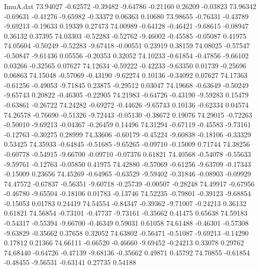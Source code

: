 \begin{filecontents}{ImuA.dat}
  73.94027   -0.62572   -0.39482   -9.64786   -0.21160    0.26209   -0.03823
  73.96342   -0.69631   -0.41276   -9.65982   -0.33372    0.06363    0.10680
  73.98655   -0.76331   -0.43789   -9.69213   -0.19633    0.19339    0.27473
  74.00989   -0.64128   -0.46421   -9.68615   -0.08947    0.36132    0.37395
  74.03303   -0.52283   -0.52762   -9.46002   -0.45585   -0.05087    0.41975
  74.05604   -0.50249   -0.52283   -9.67418   -0.00551    0.23919    0.38159
  74.08025   -0.57547   -0.50847   -9.61436    0.05556   -0.20353    0.32052
  74.10233   -0.61854   -0.47856   -9.66102    0.03266   -0.32565    0.07627
  74.12634   -0.59222   -0.42233   -9.63350    0.01739   -0.25696    0.06863
  74.15048   -0.57069   -0.43190   -9.62274    0.10136   -0.34092    0.07627
  74.17363   -0.61256   -0.49053   -9.71845    0.23875   -0.29512    0.03047
  74.19668   -0.63649   -0.50249   -9.65743    0.20822   -0.46305   -0.22905
  74.21983   -0.64726   -0.43190   -9.59283    0.15479   -0.63861   -0.26722
  74.24282   -0.69272   -0.44626   -9.65743    0.10136   -0.62334    0.04574
  74.26578   -0.76690   -0.51326   -9.72443   -0.05130   -0.38672    0.19076
  74.29015   -0.72263   -0.50010   -9.69213   -0.04367   -0.26459    0.14496
  74.31294   -0.67119   -0.45583   -9.73161   -0.12763   -0.30275    0.28999
  74.33606   -0.60179   -0.45224   -9.60838   -0.18106   -0.33329    0.53425
  74.35933   -0.64845   -0.51685   -9.65265   -0.09710   -0.15009    0.71744
  74.38256   -0.60778   -0.54915   -9.66700   -0.09710   -0.07376    0.61821
  74.40568   -0.54078   -0.55633   -9.59761   -0.12763   -0.05850    0.41975
  74.42880   -0.57069   -0.61256   -9.63709   -0.17343   -0.15009    0.23656
  74.45269   -0.64965   -0.63529   -9.59402   -0.31846   -0.08903   -0.09929
  74.47572   -0.67837   -0.56351   -9.60718   -0.25739   -0.00507   -0.28248
  74.49917   -0.67956   -0.46780   -9.65504   -0.18106    0.01783   -0.13746
  74.52235   -0.79801   -0.39123   -9.68854   -0.15053    0.01783    0.24419
  74.54554   -0.84347   -0.39362   -9.71007   -0.24213    0.36132    0.61821
  74.56854   -0.73101   -0.47737   -9.73161   -0.35662    0.41475    0.65638
  74.59183   -0.54317   -0.55394   -9.66700   -0.46349    0.59031    0.61058
  74.61488   -0.46301   -0.57308   -9.63829   -0.35662    0.37658    0.32052
  74.63802   -0.56471   -0.51087   -9.69213   -0.14290    0.17812    0.21366
  74.66111   -0.66520   -0.46660   -9.69452   -0.24213    0.33078    0.29762
  74.68440   -0.64726   -0.47139   -9.68136   -0.35662    0.49871    0.45792
  74.70855   -0.61854   -0.48455   -9.56531   -0.63141    0.27735    0.54188

\end{filecontents}
